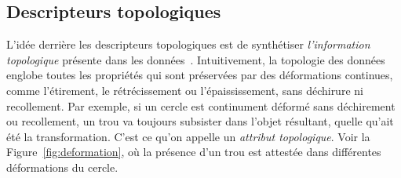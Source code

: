   
\subsection{Descripteurs topologiques}

L'id\'ee derri\`ere les descripteurs topologiques est de synth\'etiser {\em l'information topologique} pr\'esente dans les donn\'ees~\cite{Carlsson09a}.
Intuitivement, la topologie des donn\'ees englobe toutes les propri\'et\'es qui sont pr\'eserv\'ees par des d\'eformations continues, 
comme l'\'etirement, le r\'etr\'ecissement ou l'\'epaississement, sans d\'echirure ni recollement. Par exemple, 
si un cercle est continument d\'eform\'e sans d\'echirement ou recollement, un trou va toujours subsister
dans l'objet r\'esultant, quelle qu'ait \'et\'e la transformation. C'est ce qu'on appelle un {\em attribut topologique}. 
Voir la Figure~\ref{fig:deformation}, o\`u la pr\'esence d'un trou est attest\'ee dans diff\'erentes d\'eformations du cercle.

